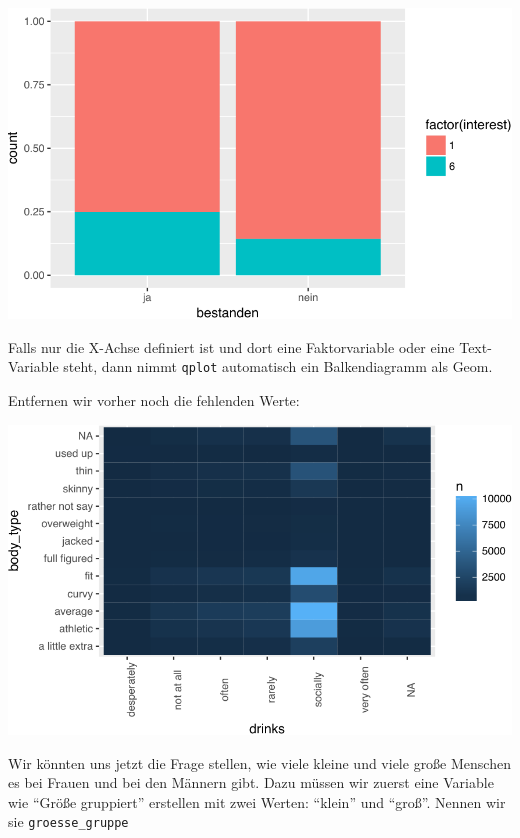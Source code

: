 \documentclass[12pt,]{book}
\newenvironment{Shaded}{\begin{snugshade}}{\end{snugshade}}
\newcommand{\KeywordTok}[1]{\textcolor[rgb]{0.13,0.29,0.53}{\textbf{{#1}}}}
\newcommand{\DataTypeTok}[1]{\textcolor[rgb]{0.13,0.29,0.53}{{#1}}}
\newcommand{\StringTok}[1]{\textcolor[rgb]{0.31,0.60,0.02}{{#1}}}
\newcommand{\NormalTok}[1]{{#1}}
\begin{document}
\begin{center}\includegraphics[width=0.7\linewidth]{050_Daten_visualisieren_files/figure-latex/unnamed-chunk-20-1} \end{center}

Falls nur die X-Achse definiert ist und dort eine Faktorvariable oder
eine Text-Variable steht, dann nimmt \texttt{qplot} automatisch ein
Balkendiagramm als Geom.

Entfernen wir vorher noch die fehlenden Werte:

\begin{Shaded}
\end{Shaded}

\begin{center}\includegraphics[width=0.7\linewidth]{050_Daten_visualisieren_files/figure-latex/unnamed-chunk-21-1} \end{center}

Wir könnten uns jetzt die Frage stellen, wie viele kleine und viele
große Menschen es bei Frauen und bei den Männern gibt. Dazu müssen wir
zuerst eine Variable wie ``Größe gruppiert'' erstellen mit zwei Werten:
``klein'' und ``groß''. Nennen wir sie \texttt{groesse\_gruppe}
\end{document}
